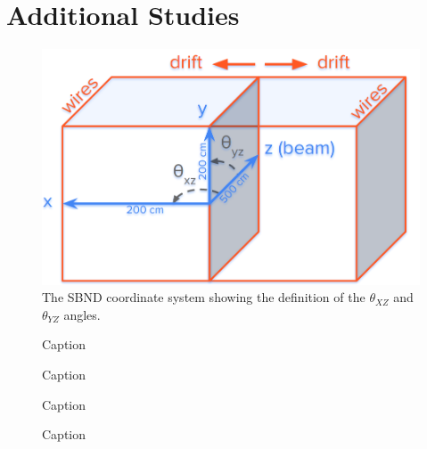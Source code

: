\chapter{Additional Studies}
\label{chap:Additional Studies}

\begin{figure}
    \centering
    \includegraphics[width =\largefigwidth]{Figures/SBND_geometry.png}
    \caption{The SBND coordinate system showing the definition of the $\theta_{XZ}$ and $\theta_{YZ}$ angles.}
    \label{fig:my_label}
\end{figure}


\begin{figure}
    \centering
    \caption{}
    \label{fig:my_label}
\end{figure}

\begin{figure}
    \centering
    \caption{Caption}
    \label{fig:my_label}
\end{figure}

\begin{figure}
    \centering
    \caption{Caption}
    \label{fig:my_label}
\end{figure}

\begin{figure}
    \centering
    \caption{Caption}
    \label{fig:my_label}
\end{figure}

\begin{figure}
    \centering
    \caption{Caption}
    \label{fig:my_label}
\end{figure}



